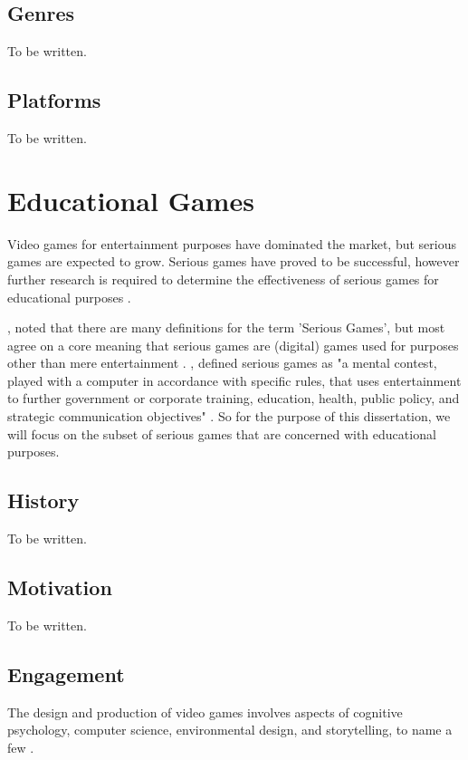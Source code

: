 \documentclass[a4paper,11.5pt]{report}
\numberwithin{figure}{section}
\numberwithin{table}{section}
\numberwithin{equation}{section}
\numberwithin{equation}{section}
\begin{document}
\subsection{Genres}

To be written.

\subsection{Platforms}

To be written.

\section{Educational Games}

Video games for entertainment purposes have dominated the market, but serious games are expected to grow. Serious games have proved to be successful, however further research is required to determine the effectiveness of serious games for educational purposes \cite{Susi2416}.

\citeauthor{Susi2416}, noted that there are many definitions for the term 'Serious Games', but most agree on a core meaning that serious games are (digital) games used for purposes other than mere entertainment \cite{Susi2416}. \citeauthor{Zyda2005}, defined serious games as "a mental contest, played with a computer in accordance with specific rules, that uses entertainment to further government or corporate training, education, health, public policy, and strategic communication objectives" \cite{Zyda2005}. So for the purpose of this dissertation, we will focus on the subset of serious games that are concerned with educational purposes.

\subsection{History}

To be written.

\subsection{Motivation}

To be written.

\subsection{Engagement}

The design and production of video games involves aspects of cognitive psychology, computer science, environmental design, and storytelling, to name a few \cite{Koster2004}.
\end{document}
